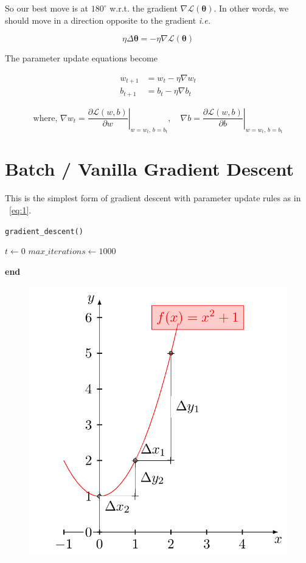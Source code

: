 \documentclass[11pt, a4paper]{article}
\begin{document}
So our best move is at $180^{\circ}$ w.r.t. the gradient $\nabla \mathscr{L}(\boldsymbol{\theta})$.  In other words, we should move in a direction opposite to the gradient \textit{i.e.}

$$ \eta \Delta\boldsymbol{\theta} = - \eta \nabla \mathscr{L}(\boldsymbol{\theta})$$

The parameter update equations become

\begin{align} \label{eq:1}
w_{t+1} &= w_t - \eta \nabla w_t \nonumber \\
b_{t+1} &= b_t - \eta \nabla b_t
\end{align}

$$ \text{where, } \nabla w_t = \left. \dfrac{\partial \mathscr{L}(w, b)}{\partial w} \right|_{w = w_t,\, b = b_t}, \quad
\nabla b = \left. \dfrac{\partial \mathscr{L}(w, b)}{\partial b} \right|_{w = w_t,\, b = b_t} $$

\section{Batch / Vanilla Gradient Descent}

This is the simplest form of gradient descent with parameter update rules as in ~\ref{eq:1}. \\[0.15em]

\begin{algorithm}[H]
\caption{\texttt{gradient\_descent()}}
$t \leftarrow 0$\;
$max\_iterations \leftarrow 1000$\;

\textbf{end}
\end{algorithm}



\begin{figure}[!htbp]
\centering
\includegraphics[scale=0.5]{image_3}
\end{figure}
\end{document}
